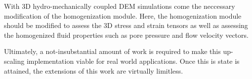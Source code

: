 With 3D hydro-mechanically coupled DEM simulations come the neccessary modification of the homogenization module. Here, the homogenization module should be modified to assess the 3D stress and strain tensors as well as assessing the homogenized fluid properties such as pore pressure and flow velocity vectors. 

Ultimately, a not-insubstantial amount of work is required to make this up-scaling implementation viable for real world applications. Once this is state is attained, the extensions of this work are virtually limitless.